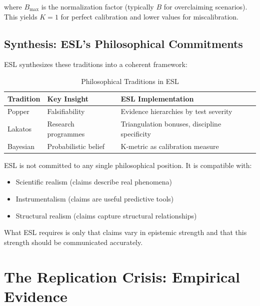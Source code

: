 \documentclass[11pt,a4paper]{article}
\begin{document}
where $B_{\max}$ is the normalization factor (typically $B$ for overclaiming scenarios). This yields $K = 1$ for perfect calibration and lower values for miscalibration.

\subsection{Synthesis: ESL's Philosophical Commitments}

ESL synthesizes these traditions into a coherent framework:

\begin{table}[h]
\centering
\caption{Philosophical Traditions in ESL}
\label{tab:philosophy}
\begin{tabular}{lll}
\toprule
\textbf{Tradition} & \textbf{Key Insight} & \textbf{ESL Implementation} \\
\midrule
Popper & Falsifiability & Evidence hierarchies by test severity \\
Lakatos & Research programmes & Triangulation bonuses, discipline specificity \\
Bayesian & Probabilistic belief & K-metric as calibration measure \\
\bottomrule
\end{tabular}
\end{table}

ESL is not committed to any single philosophical position. It is compatible with:
\begin{itemize}
    \item Scientific realism (claims describe real phenomena)
    \item Instrumentalism (claims are useful predictive tools)
    \item Structural realism (claims capture structural relationships)
\end{itemize}

What ESL requires is only that claims vary in epistemic strength and that this strength should be communicated accurately.


\section{The Replication Crisis: Empirical Evidence}
\label{sec:replication-crisis}
\end{document}
